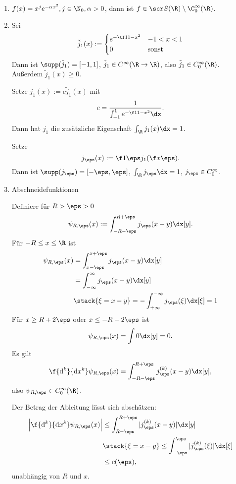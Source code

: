 \begin{ex} \label{4.2}
	\begin{enumerate}[1)]
		\item
			$f(x) = x^j e^{-\alpha x^2}, j \in \N_0, \alpha > 0$, dann ist $f \in \scr S(\R) \setminus \C_0^\infty (\R)$.
		\item
			Sei
			\[
				\tilde j_1(x) := \begin{cases}
					e^{-\tf 1{1-x^2}} & -1 < x < 1 \\
					0 & \text{sonst}
				\end{cases}
			\]
			Dann ist $\supp(\tilde j_1) = [-1,1]$, $\tilde j_1 \in C^\infty(\R \to \R)$, also $\tilde j_1 \in C_0^\infty(\R)$.
			Außerdem $\tilde j_1(x) \ge 0$.

			Setze $j_1(x) := c \tilde j_1(x)$ mit
			\[
				c = \dfrac 1{\int_{-1}^1 e^{- \f 1{1-x^2}} \dx}.
			\]
			Dann hat $j_1$ die zusätzliche Eigenschaft $\int_{\R} j_1(x) \dx = 1$.

			Setze
			\[
				j_\eps(x) := \f 1\eps j_1(\f x\eps).
			\]
			Dann ist $\supp(j_\eps) = [-\eps, \eps]$, $\int_\R j_\eps \dx = 1$, $j_\eps \in C_0^\infty$.
		\item
			Abschneidefunktionen

			Definiere für $R > \eps > 0$
			\[
				\psi_{R, \eps}(x) := \int_{-R-\eps}^{R+ \eps} j_\eps(x-y) \dx[y].
			\]
			Für $-R \le x \le \R$ ist
			\begin{align*}
				\psi_{R, \eps}(x) 
				&= \int_{x-\eps}^{x+\eps} j_\eps (x-y) \dx[y] \\
				&= \int_{-\infty}^\infty j_\eps(x-y) \dx[y] \\
				&\stack{\xi = x-y} = -\int_{+\infty}^{-\infty}  j_\eps (\xi) \dx[\xi] = 1
			\end{align*}
			Für $x \ge R + 2\eps$ oder $x \le - R - 2\eps$ ist
			\[
				\psi_{R,\eps}(x) = \int 0 \dx[y] = 0.
			\]
			Es gilt
			\[
				\f {\mathrm{d}^k}{\mathrm{d}x^k} \psi_{R,\eps}(x) 
				= \int_{-R-\eps}^{R+\eps} j_\eps^{(k)} (x-y) \dx[y],
			\]
			also $\psi_{R,\eps} \in C_0^\infty (\R)$.

			Der Betrag der Ableitung lässt sich abschätzen:
			\begin{align*}
				\Big| \f {\mathrm{d}^k}{\mathrm{d}x^k} \psi_{R,\eps}(x) \Big|
				&\le \int_{R-\eps}^{R+\eps} |j_\eps^{(k)}(x-y)| \dx[y] \\
				&\stack{\xi = x-y}\le \int_{-\eps}^\eps |j_\eps^{(k)}(\xi)| \dx[\xi] \\
				&\le c(\eps),
			\end{align*}
			unabhängig von $R$ und $x$.
	\end{enumerate}
\end{ex}


